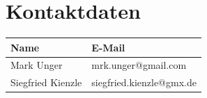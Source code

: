 \documentclass[12pt]{scrartcl}
\begin{document}
\section{Kontaktdaten}
\label{sec:kontaktdaten}
\begin{table}[H]
\label{kontaktdaten}
\begin{tabular}{|l|l|}
\hline
\rowcolor[HTML]{9B9B9B} 
Name              & E-Mail                   \\ \hline
Mark Unger        & mrk.unger@gmail.com      \\ \hline
Siegfried Kienzle & siegfried.kienzle@gmx.de \\ \hline
\end{tabular}
\end{table}
\end{document}
